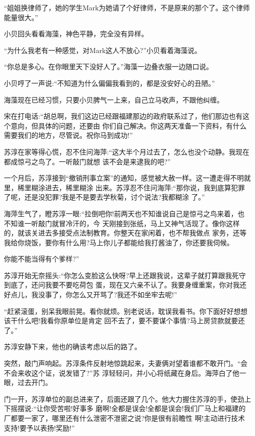 \documentclass[11pt,a4paper,onecolumn]{article}
\begin{document}
``姐姐换律师了，她的学生Mark为她请了个好律师，不是原来的那个了。这个律师能量很大。''

小贝回头看看海藻，神色平静，完全没有异样。

``为什么我老有一种感觉，对Mark这人不放心?''小贝看着海藻说。

``你总是多心。在你眼里天下没好人了。''海藻一边叠衣服一边随口说。

小贝哼了一声说:``不知道为什么偏偏我看到的，都是没安好心的丑陋。''

海藻现在已经习惯，只要小贝脾气一上来，自己立马收声，不跟他纠缠。

宋在打电话:``胡总啊，我们这边已经跟福建那边的政府联系过了，他们那边也有这个意向，但具体的问题，还要由
你们自己解决。你这两天准备一下资料，有什么需要我们的地方，尽管说。祝你马到成功!''

苏淳在家等得心慌，忍不住问海萍:``这大半个月过去了，怎么也没个动静。我现在都成惊弓之鸟了。一听敲门就想
该不会是来逮我的吧?''

一个月后，苏淳接到``撤销刑事立案''的通知，感觉被大赦一样。这一遭走得不明就里，稀里糊涂进去，稀里糊涂
出来。苏淳忍不住问海萍:``那你说，我到底算犯罪了呢，还是没犯罪?我是不是要去学秋菊，讨个说法?我都糊涂
了。''

海萍生气了，瞪苏淳一眼:``拉倒吧你!前两天也不知谁说自己是惊弓之鸟来着，也不知谁一听敲门就冒冷汗的，今
天刚接到张纸，马上又神气活现了。像你这样的，就该关进去多接受点法制教育。你整天在家闲着，也不帮我做点
家务，还等我给你烧饭，要你有什么用?马上你儿子都能给我打酱油了，你还要我伺候。

你能不能当得有个爹样?''

苏淳开始无奈摇头:``你怎么变脸这么快呀?早上还跟我说，这辈子就打算跟我死守到底了，还问我要不要吃荷包
蛋，现在又六亲不认了。我要身缠重案，你对我还好点儿，我没事了，你怎么又开骂了?我还不如坐牢去呢!''

``赶紧滚蛋，别呆我眼前晃。看你就烦。别老说话，耽误我看书。你下面好好想想该干什么吧!我看你原单位是肯定
回不去了，要不要谋个事情?马上房贷款就要还了。''

苏淳安静下来，他也的确该考虑以后的路了。

突然，敲门声响起。苏淳条件反射地惊跳起来，夫妻俩对望着谁都不敢开门。``会不会来收这个证，说发错了?''苏
淳轻轻问，并小心将纸藏在身后。海萍白了他一眼，过去开门。

门一开，苏淳单位的副总进来了，后面还跟了几个。他大力握住苏淳的手，使劲上下摇摆说:``让你受苦啦!好事多
磨啊!全都是误会!全都是误会!我们厂马上和福建的厂都要一家了，哪里还有什么泄密不泄密之说?你是很有前瞻性
啊!主动进行技术支持!要予以表扬!奖励!''
\end{document}
